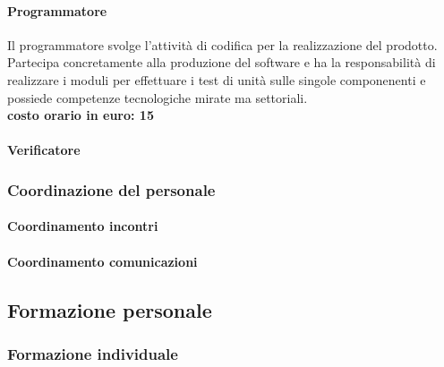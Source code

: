 \documentclass[../norme-di-progetto.tex]{subfiles}
\begin{document}
\paragraph{Programmatore}
Il programmatore svolge l'attività di codifica per la realizzazione del prodotto. Partecipa concretamente alla produzione del software e ha la responsabilità di realizzare i moduli per effettuare i test di unità sulle singole componenenti e possiede competenze tecnologiche mirate ma settoriali.
\\
\newline\textbf{costo orario in euro: 15}
\paragraph{Verificatore}
\subsubsection{Coordinazione del personale}
\paragraph{Coordinamento incontri}
\paragraph{Coordinamento comunicazioni}
\subsection{Formazione personale}
\subsubsection{Formazione individuale}
\end{document}

